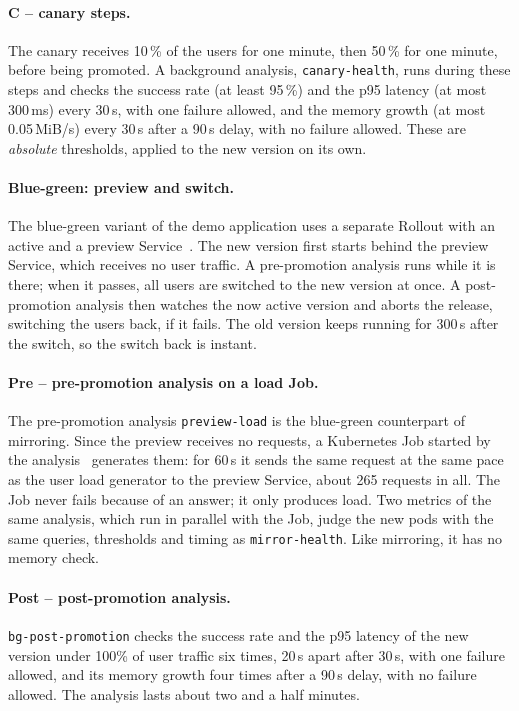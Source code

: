 \paragraph{C -- canary steps.} The canary receives 10\,\% of the users for one minute, then 50\,\% for one minute, before being promoted. A background analysis, \texttt{canary-health}, runs during these steps and checks the success rate (at least 95\,\%) and the p95 latency (at most 300\,ms) every 30\,s, with one failure allowed, and the memory growth (at most 0.05\,MiB/s) every 30\,s after a 90\,s delay, with no failure allowed. These are \emph{absolute} thresholds, applied to the new version on its own.

\paragraph{Blue-green: preview and switch.} The blue-green variant of the demo application uses a separate Rollout with an active and a preview Service~\cite{ArgoRolloutsBlueGreen}. The new version first starts behind the preview Service, which receives no user traffic. A pre-promotion analysis runs while it is there; when it passes, all users are switched to the new version at once. A post-promotion analysis then watches the now active version and aborts the release, switching the users back, if it fails. The old version keeps running for 300\,s after the switch, so the switch back is instant.

\paragraph{Pre -- pre-promotion analysis on a load Job.} The pre-promotion analysis \texttt{preview-load} is the blue-green counterpart of mirroring. Since the preview receives no requests, a Kubernetes Job started by the analysis~\cite{ArgoRolloutsJob} generates them: for 60\,s it sends the same request at the same pace as the user load generator to the preview Service, about 265 requests in all. The Job never fails because of an answer; it only produces load. Two metrics of the same analysis, which run in parallel with the Job, judge the new pods with the same queries, thresholds and timing as \texttt{mirror-health}. Like mirroring, it has no memory check.

\paragraph{Post -- post-promotion analysis.} \texttt{bg-post-promotion} checks the success rate and the p95 latency of the new version under 100\% of user traffic six times, 20\,s apart after 30\,s, with one failure allowed, and its memory growth four times after a 90\,s delay, with no failure allowed. The analysis lasts about two and a half minutes.

